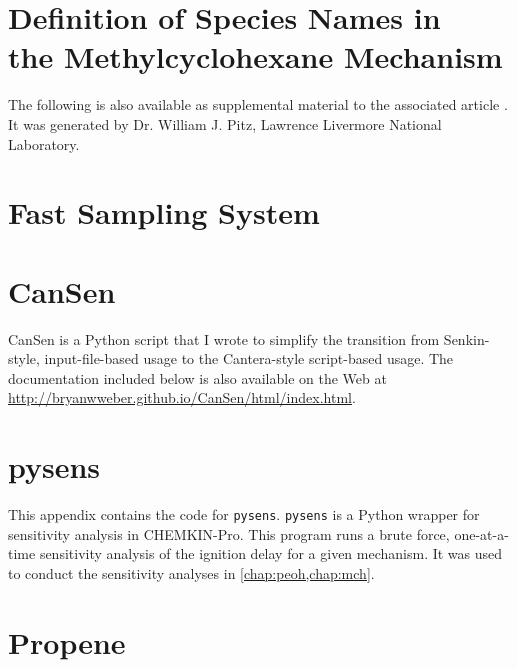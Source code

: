 \documentclass[12pt,letterpaper,oneside,final,openany]{book}
\begin{document}
\begin{appendices}
\makeatletter
\addappheadtotoc
{}
%
\makeatother
{}

\chapter[Definition of Species Names in the Methylcyclohexane Mechanism]%
{Definition of Species Names in\\the Methylcyclohexane Mechanism}
\label{app:mch-dict}
The following is also available as supplemental material to the associated article \cite{Weber2014}.
It was generated by Dr. William J. Pitz, Lawrence Livermore National Laboratory.



\chapter{Fast Sampling System}
\label{app:fast-sampling-system}



\chapter{CanSen}
\label{app:cansen}
CanSen is a Python script that I wrote to simplify the transition from
Senkin-style, input-file-based usage to the Cantera-style script-based usage.
The documentation included below is also available on the Web at
\url{http://bryanwweber.github.io/CanSen/html/index.html}.



\chapter{pysens}
\label{app:pysens}
This appendix contains the code for \verb|pysens|. \verb|pysens| is a Python wrapper
for sensitivity analysis in CHEMKIN-Pro. This program runs a brute
force, one-at-a-time sensitivity analysis of the ignition delay for a
given mechanism. It was used to conduct the sensitivity analyses in
\cref{chap:peoh,chap:mch}.

\blankline



\chapter{Propene}
\label{app:propene}


\end{appendices}
\end{document}
